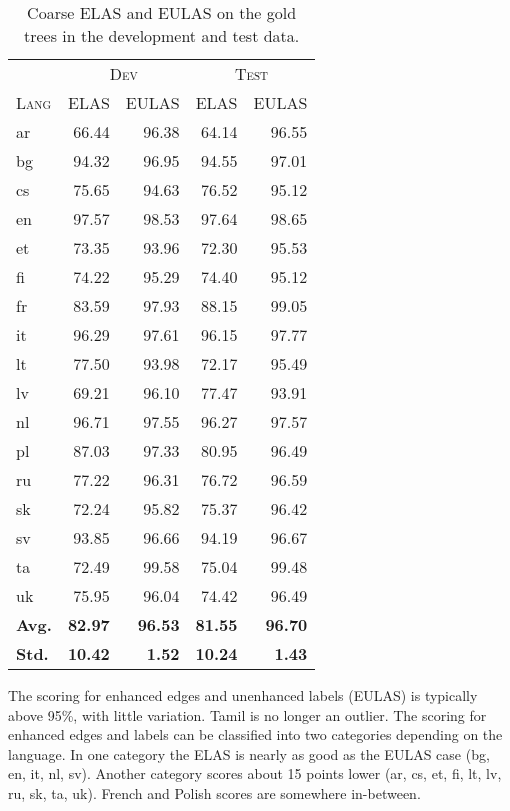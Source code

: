 \documentclass[11pt,a4paper]{article}
\begin{document}
\begin{table}[ht]
	\centering
    \small
	\begin{tabular}{l|rrrr}
        & \multicolumn{2}{c}{\textsc{Dev}} & \multicolumn{2}{c}{\textsc{Test}} \\
		\textsc{Lang} & \textsc{ELAS} & \textsc{EULAS} & \textsc{ELAS} & \textsc{EULAS} \\
		\hline 
		ar & 66.44 & 96.38 & 64.14 & 96.55 \\
		bg & 94.32 & 96.95 & 94.55 & 97.01 \\
		cs & 75.65 & 94.63 & 76.52 & 95.12 \\
		en & 97.57 & 98.53 & 97.64 & 98.65 \\
		et & 73.35 & 93.96 & 72.30 & 95.53 \\
		fi & 74.22 & 95.29 & 74.40 & 95.12 \\
		fr & 83.59 & 97.93 & 88.15 & 99.05 \\
		it & 96.29 & 97.61 & 96.15 & 97.77 \\
		lt & 77.50 & 93.98 & 72.17 & 95.49 \\
		lv & 69.21 & 96.10 & 77.47 & 93.91 \\
		nl & 96.71 & 97.55 & 96.27 & 97.57 \\
		pl & 87.03 & 97.33 & 80.95 & 96.49 \\
		ru & 77.22 & 96.31 & 76.72 & 96.59 \\
		sk & 72.24 & 95.82 & 75.37 & 96.42 \\
		sv & 93.85 & 96.66 & 94.19 & 96.67 \\
		ta & 72.49 & 99.58 & 75.04 & 99.48 \\
		uk & 75.95 & 96.04 & 74.42 & 96.49 \\
		\textbf{Avg.} & \textbf{82.97}  & \textbf{96.53}& \textbf{81.55} & \textbf{96.70} \\
        \textbf{Std.} & \textbf{10.42} & \textbf{1.52} & \textbf{10.24} & \textbf{1.43} \\
	\end{tabular}
	\caption{\label{tab:gold-data}Coarse ELAS and EULAS on the gold trees in the development and test data.}
\end{table} 

The scoring for enhanced edges and unenhanced labels (EULAS) is typically
above 95\%, with little variation. Tamil is no longer an
outlier. The scoring for enhanced edges and labels can be
classified into two categories depending on the language. In one
category the ELAS is nearly as good as the EULAS case (bg, en,
it, nl, sv). Another category scores about 15 points lower (ar,
cs, et, fi, lt, lv, ru, sk, ta, uk). French and Polish scores are
somewhere in-between.
\end{document}
